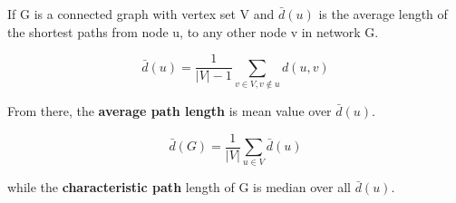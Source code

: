 If G is a connected graph with vertex set V and $\bar{d}(u)$ is the average length of the shortest paths from node u, to any other node v in network G.

\begin{equation}
\bar{d}(u) = \frac{1}{|V|-1} \sum_{v\in V, v \notin u} d(u,v)  
\end{equation}

From there, the \textbf{average path length} is mean value over $\bar{d}(u)$.

\begin{equation}
\bar{d}(G) = \frac{1}{|V|}\sum_{u \in V} \bar{d}(u)
\end{equation}

while the \textbf{characteristic path} length of G is median over all $\bar{d}(u)$.










